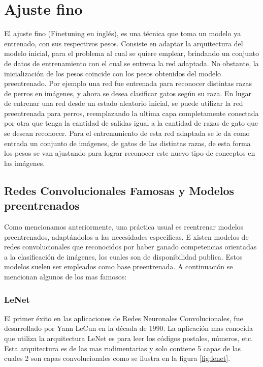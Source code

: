 \documentclass[a4paper,11pt,spanish]{book}
\begin{document}
    \section {Ajuste fino} \label{sec:finetuning}
      El ajuste fino (Finetuning en inglés), es una técnica que toma un modelo ya entrenado, con sus respectivos pesos. Consiste en adaptar la arquitectura
      del modelo inicial, para el problema al cual se quiere emplear, brindando un conjunto de datos de entrenamiento con el cual se entrena la red adaptada.
      No obstante, la inicialización de los pesos coincide con los pesos obtenidos del modelo preentrenado.
      Por ejemplo una red fue entrenada para reconocer distintas razas de perros en imágenes, y ahora se desea clasificar gatos según su raza. 
      En lugar de entrenar una red desde un estado aleatorio inicial, se puede utilizar la red preentrenada para perros, reemplazando la ultima capa completamente conectada
      por otra que tenga la cantidad de salidas igual a la cantidad de razas de gato que se desean reconocer.
      Para el entrenamiento de esta red adaptada se le da como entrada un conjunto de imágenes, de gatos de las distintas razas, de esta forma los  pesos se van
      ajustando para lograr reconocer este nuevo tipo de conceptos en las imágenes.
      
      \subsection{Redes Convolucionales Famosas y Modelos preentrenados} \label{sec:cnn_famosas}
	Como mencionamos anteriormente, una práctica usual es reentrenar modelos preentrenados, adaptándolos a las necesidades especificas. E
	xisten modelos de redes convolucionales	que reconocidos por haber ganado competencias orientadas a la clasificación de imágenes, 
	los cuales son de disponibilidad publica. Estos modelos suelen ser empleados como base 
	preentrenada. A continuación se mencionan algunos de los mas famosos:
	
	\subsubsection{LeNet}
	  El primer éxito en las aplicaciones de Redes Neuronales Convolucionales, fue desarrollado por Yann LeCun \cite{Lecun:LeNet} en la década de 1990.
	  La aplicación mas conocida que utiliza la arquitectura LeNet es para leer los códigos postales, números, etc. Esta arquitectura es de las mas rudimentarias y 
	  solo contiene 5 capas de las cuales 2 son capas convolucionales como se ilustra en la figura \ref{fig:lenet}. 
	  
\end{document}
